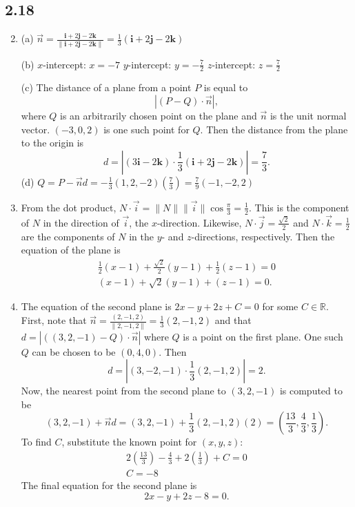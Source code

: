\documentclass[a4paper,12pt]{article}
\begin{document}
\subsection*{2.18}

\begin{enumerate}

\setcounter{enumi}{1}
\item (a) $\vec{n} = \frac{\bm{i} + 2\bm{j} - 2\bm{k}}{\|{\bm{i} + 2\bm{j} - 2\bm{k}\|}} = \frac{1}{3}(\bm{i} + 2\bm{j} - 2\bm{k})$ \par
(b) $x$-intercept: $x = -7$ \newline
	$y$-intercept: $y = -\frac{7}{2}$ \newline
	$z$-intercept: $z = \frac{7}{2}$ \par
(c) The distance of a plane from a point $P$ is equal to
\[ |(P - Q) \cdot \vec{n}|, \]
where $Q$ is an arbitrarily chosen point on the plane and $\vec{n}$ is the unit normal vector. $(-3, 0, 2)$ is one such point for $Q$. Then the distance from the plane to the origin is
\[ d = |(3\bm{i} - 2\bm{k}) \cdot \frac{1}{3}(\bm{i} + 2\bm{j} - 2\bm{k})| = \frac{7}{3}. \]
(d) $Q = P - \vec{n}d = -\frac{1}{3}(1, 2, -2)\left(\frac{7}{3}\right) = \frac{7}{9}(-1, -2, 2)$

\setcounter{enumi}{10}
\item From the dot product, $N \cdot \vec{i} = \|N\|\|\vec{i}\|\cos{\frac{\pi}{3}} = \frac{1}{2}$. This is the component of $N$ in the direction of $\vec{i}$, the $x$-direction. Likewise, $N \cdot \vec{j} = \frac{\sqrt{2}}{2}$ and $N \cdot \vec{k} = \frac{1}{2}$ are the components of $N$ in the $y$- and $z$-directions, respectively. Then the equation of the plane is
\begin{gather*}
\frac{1}{2}(x - 1) + \frac{\sqrt{2}}{2}(y - 1) + \frac{1}{2}(z - 1) = 0 \\
(x - 1) + \sqrt{2}(y - 1) + (z - 1) = 0.
\end{gather*}

\setcounter{enumi}{19}
\item The equation of the second plane is $2x - y + 2z + C = 0$ for some $C \in \mathbb{R}$. First, note that $\vec{n} = \frac{(2, -1, 2)}{\|2, -1, 2\|} = \frac{1}{3}(2, -1, 2)$ and that $d = |((3, 2, -1) - Q) \cdot \vec{n}|$ where $Q$ is a point on the first plane. One such $Q$ can be chosen to be $(0, 4, 0)$. Then
\[ d = |(3, -2, -1) \cdot \frac{1}{3}(2, -1, 2)| = 2. \]
Now, the nearest point from the second plane to $(3, 2, -1)$ is computed to be
\[ (3, 2, -1) + \vec{n}d = (3, 2, -1) + \frac{1}{3}(2, -1, 2)(2) = \left(\frac{13}{3}, \frac{4}{3}, \frac{1}{3}\right). \]
To find $C$, substitute the known point for $(x, y, z)$:
\begin{gather*}
2\left(\frac{13}{3}\right) - \frac{4}{3} + 2\left(\frac{1}{3}\right) + C = 0 \\
C = -8
\end{gather*}
The final equation for the second plane is
\[ 2x - y + 2z - 8 = 0. \]

\end{enumerate}
\end{document}
